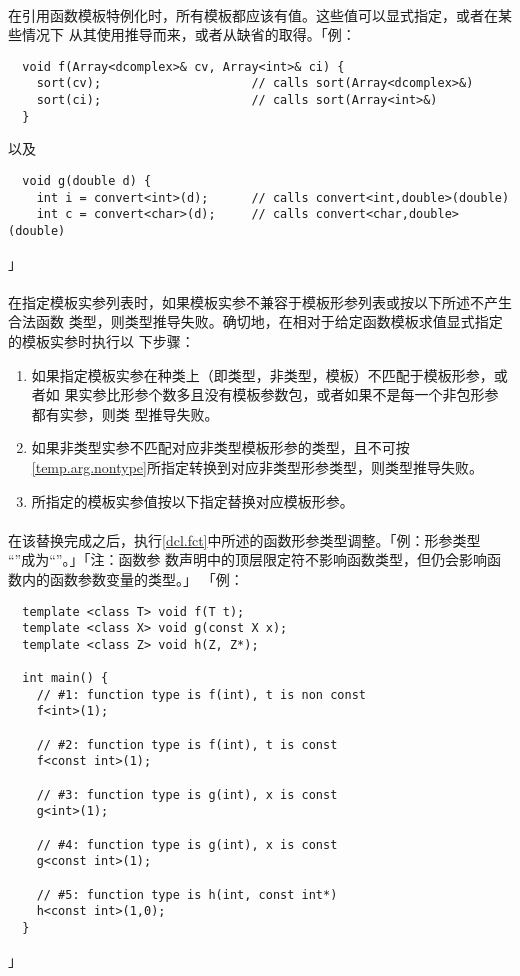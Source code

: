 \paragraph{}
在引用函数模板特例化时，所有模板都应该有值。这些值可以显式指定，或者在某些情况下
从其使用推导而来，或者从缺省的取得。「例：
\begin{lstlisting}
  void f(Array<dcomplex>& cv, Array<int>& ci) {
    sort(cv);                     // calls sort(Array<dcomplex>&)
    sort(ci);                     // calls sort(Array<int>&)
  }
\end{lstlisting}
以及
\begin{lstlisting}
  void g(double d) {
    int i = convert<int>(d);      // calls convert<int,double>(double)
    int c = convert<char>(d);     // calls convert<char,double>(double)
\end{lstlisting}」

\paragraph{}
在指定模板实参列表时，如果模板实参不兼容于模板形参列表或按以下所述不产生合法函数
类型，则类型推导失败。确切地，在相对于给定函数模板求值显式指定的模板实参时执行以
下步骤：
\begin{enumerate}
  \item{如果指定模板实参在种类上（即类型，非类型，模板）不匹配于模板形参，或者如
    果实参比形参个数多且没有模板参数包，或者如果不是每一个非包形参都有实参，则类
    型推导失败。}
  \item{如果非类型实参不匹配对应非类型模板形参的类型，且不可按
    \ref{temp.arg.nontype}所指定转换到对应非类型形参类型，则类型推导失败。}
  \item{所指定的模板实参值按以下指定替换对应模板形参。}
\end{enumerate}

\paragraph{}
在该替换完成之后，执行\ref{dcl.fct}中所述的函数形参类型调整。「例：形参类型
``''成为``''。」「注：函数参
数声明中的顶层限定符不影响函数类型，但仍会影响函数内的函数参数变量的类型。」
「例：
\begin{lstlisting}
  template <class T> void f(T t);
  template <class X> void g(const X x);
  template <class Z> void h(Z, Z*);

  int main() {
    // #1: function type is f(int), t is non const
    f<int>(1);

    // #2: function type is f(int), t is const
    f<const int>(1);

    // #3: function type is g(int), x is const
    g<int>(1);

    // #4: function type is g(int), x is const
    g<const int>(1);

    // #5: function type is h(int, const int*)
    h<const int>(1,0);
  }
\end{lstlisting}」

